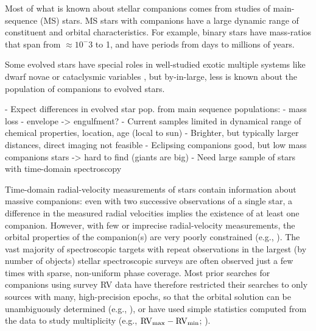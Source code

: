 \documentclass[modern, letterpaper]{aastex62}
\begin{document}

Most of what is known about stellar companions comes from studies of
main-sequence (MS) stars.
MS stars with companions have a large dynamic range of constituent and orbital
characteristics.
For example, binary stars have mass-ratios that span from $\approx 10^-3$
 to 1, and have periods from days to
millions of years.

Some evolved stars have special roles in well-studied exotic multiple systems
like dwarf novae or cataclysmic variables ,
but by-in-large, less is known about the population of companions to evolved
stars.

- Expect differences in evolved star pop. from main sequence populations:
  - mass loss
  - envelope -> engulfment?
- Current samples limited in dynamical range of chemical properties, location,
  age (local to sun)
- Brighter, but typically larger distances, direct imaging not feasible
- Eclipsing companions good, but low mass companions stars -> hard to find
  (giants are big)
- Need large sample of stars with time-domain spectroscopy


Time-domain radial-velocity measurements of stars contain information about
massive companions: even with two successive observations of a single star, a
difference in the measured radial velocities implies the existence of at least
one companion.
However, with few or imprecise radial-velocity measurements, the orbital
properties of the companion(s) are very poorly constrained (e.g.,
\citealt{Price-Whelan:2017}).
The vast majority of spectroscopic targets with repeat observations in the
largest (by number of objects) stellar spectroscopic surveys are often observed
just a few times with sparse, non-uniform phase coverage.
Most prior searches for companions using survey RV data have therefore
restricted their searches to only sources with many, high-precision epochs, so
that the orbital solution can be unambiguously determined (e.g.,
\citealt{Troup:2016}), or have used simple statistics computed from the data to
study multiplicity (e.g., ${\rm RV}_{\rm max} - {\rm RV}_{\rm min}$;
\citealt{Badenes:2017}).
\end{document}
